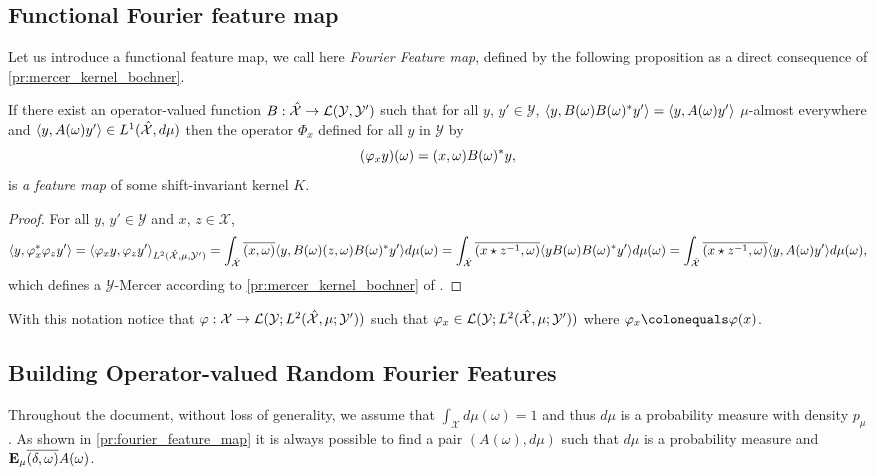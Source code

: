 \subsection{Functional Fourier feature map}
Let us introduce a functional feature map, we call here \emph{Fourier Feature map}, defined by the following proposition as a direct consequence of \cref{pr:mercer_kernel_bochner}.

\begin{proposition}\label{pr:fourier_feature_map}
If there exist an operator-valued function $B:\hat{\mathcal{X}}\to\mathcal{L}(\mathcal{Y},\mathcal{Y}')$ such that for all $y$, $y'\in\mathcal{Y}$, $\langle y, B(\omega)B(\omega)^*y'\rangle=\langle y, A(\omega)y'\rangle$ $\mu$-almost everywhere and $\langle y, A(\omega)y'\rangle\in L^1(\hat{\mathcal{X}},d\mu)$ then the operator $\Phi_x$ defined for all $y$ in $\mathcal{Y}$ by
\begin{dmath}
\label{eq:feature_shiftinv_map}
(\Phi_x y)(\omega)=\pairing{x,\omega}B(\omega)^*y,
\end{dmath}
is \emph{a feature map} of some shift-invariant kernel $K$.
\end{proposition}
\begin{proof}
For all $y$, $y'\in \mathcal{Y}$ and $x$, $z\in\mathcal{X}$,
\begin{dmath*}
\inner{y, \Phi_x^*\Phi_z y'} = \inner{\Phi_x y, \Phi_z y'}_{L^2(\dual{\mathcal{X}},\mu,\mathcal{Y}')} \\
= \int_{\dual{\mathcal{X}}}\conj{\pairing{x,\omega}}\inner{y, B(\omega)\pairing{z,\omega}B(\omega)^\adjoint y'}d\mu(\omega) \\
= \int_{\dual{\mathcal{X}}}\conj{\pairing{x \groupop \myinv{z},\omega}}\inner{y B(\omega)B(\omega)^\adjoint y'}d\mu(\omega) \\
= \int_{\dual{\mathcal{X}}}\conj{\pairing{x \groupop \inv{z},\omega}}\inner{y,A(\omega)y'}d\mu(\omega),
\end{dmath*}
which defines a $\mathcal{Y}$-Mercer according to \cref{pr:mercer_kernel_bochner} of \citet{Carmeli2010}.
\end{proof}
With this notation notice that $\Phi: \mathcal{X} \to \mathcal{L}(\mathcal{Y}; L^2(\dual{\mathcal{X}}, \mu; \mathcal{Y}'))$ such that $\Phi_x\in \mathcal{L}(\mathcal{Y}; L^2(\dual{\mathcal{X}}, \mu; \mathcal{Y}'))$ where $\Phi_x\colonequals\Phi(x)$.

\subsection{Building Operator-valued Random Fourier Features}
Throughout the document, without loss of generality, we assume that $\int_{\mathcal{X}} d\mu(\omega)=1$ and thus $d\mu$ is a probability measure with density $p_{\mu}$. As shown in \cref{pr:fourier_feature_map} it is always possible to find a pair $(A(\omega), d\mu)$ such that $d\mu$ is a probability measure and ${\text{\textbf{E}}}_\mu{\overline{(\delta,\omega)}A(\omega)}$.
